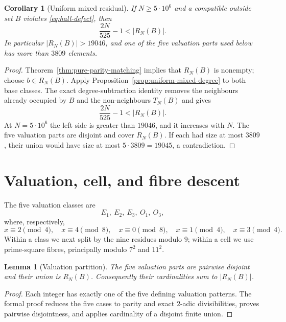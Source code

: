 \documentclass[11pt]{article}
\newtheorem{lemma}[theorem]{Lemma}
\newtheorem{corollary}[theorem]{Corollary}
\theoremstyle{definition}
\newcommand{\TN}{T_N}
\newcommand{\RN}{R_N}
\newcommand{\FiveMillion}{5\cdot10^6}
\begin{document}
\begin{corollary}[Uniform mixed residual]\label{cor:uniform-mixed-residual}
If $N\geq\FiveMillion$ and a compatible outside set $B$ violates
\eqref{eq:hall-defect}, then
\begin{equation}\label{eq:mixed-residual}
  \frac{2N}{525}-1<|\RN(B)|.
\end{equation}
In particular $|\RN(B)|>19046$, and one of the five valuation parts used
below has more than $3809$ elements.
\end{corollary}

\begin{proof}
Theorem~\ref{thm:pure-parity-matching} implies that $\RN(B)$ is nonempty;
choose $b\in\RN(B)$.  Apply Proposition~\ref{prop:uniform-mixed-degree} to
both base classes.  The exact degree-subtraction identity removes the
neighbours already occupied by $B$ and the non-neighbours $\TN(B)$ and gives
\[
 \frac{2N}{525}-1<|\RN(B)|.
\]
At $N=\FiveMillion$ the left side is greater than $19046$, and it increases
with $N$.  The five valuation parts are disjoint and cover $\RN(B)$.  If
each had size at most $3809$, their union would have size at most
$5\cdot3809=19045$, a contradiction.
\end{proof}

\section{Valuation, cell, and fibre descent}

The five valuation classes are
\[
 E_1,\ E_2,\ E_3,\ O_1,\ O_3,
\]
where, respectively,
\[
 x\equiv2\pmod4,\quad x\equiv4\pmod8,\quad x\equiv0\pmod8,
 \quad x\equiv1\pmod4,\quad x\equiv3\pmod4.
\]
Within a class we next split by the nine residues modulo $9$; within a cell
we use prime-square fibres, principally modulo $7^2$ and $11^2$.

\begin{lemma}[Valuation partition]\label{lem:valuation-partition}
The five valuation parts are pairwise disjoint and their union is
$\RN(B)$.  Consequently their cardinalities sum to $|\RN(B)|$.
\end{lemma}

\begin{proof}
Each integer has exactly one of the five defining valuation patterns.  The
formal proof reduces the five cases to parity and exact $2$-adic
divisibilities, proves pairwise disjointness, and applies cardinality of a
disjoint finite union.
\end{proof}
\end{document}
